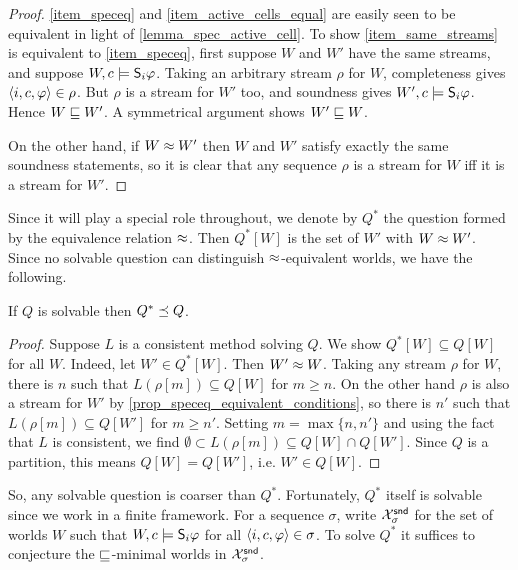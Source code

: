 \begin{proof}
    \cref{item_speceq} and \cref{item_active_cells_equal} are easily seen to be
    equivalent in light of \cref{lemma_spec_active_cell}. To show
    \cref{item_same_streams} is equivalent to \cref{item_speceq}, first suppose
    $W$ and $W'$ have the same streams, and suppose $W, c \models \S_i\phi$.
    Taking an arbitrary stream $\rho$ for $W$, completeness gives $\tuple{i, c,
    \phi} \in \rho$. But $\rho$ is a stream for $W'$ too, and soundness gives
    $W', c \models \S_i\phi$. Hence $W \specleq W'$. A symmetrical argument
    shows $W' \specleq W$.

    On the other hand, if $W \speceq W'$ then $W$ and $W'$ satisfy exactly the
    same soundness statements, so it is clear that any sequence $\rho$ is a
    stream for $W$ iff it is a stream for $W'$.
\end{proof}

Since it will play a special role throughout, we denote by $Q^*$ the question
formed by the equivalence relation $\speceq$. Then $Q^*[W]$ is the set of $W'$
with $W \speceq W'$. Since no solvable question can distinguish
$\speceq$-equivalent worlds, we have the following.

\begin{lemma}
    \label{lemma_solvable_implies_coarser_than_qstar}
    If $Q$ is solvable then $Q^* \refines Q$.
\end{lemma}

\begin{proof}
    Suppose $L$ is a consistent method solving $Q$. We show $Q^*[W] \subseteq
    Q[W]$ for all $W$.  Indeed, let $W' \in Q^*[W]$. Then $W' \speceq W$.
    Taking any stream $\rho$ for $W$, there is $n$ such that $L(\rho[m])
    \subseteq Q[W]$ for $m \ge n$. On the other hand $\rho$ is also a stream
    for $W'$ by \cref{prop_speceq_equivalent_conditions}, so there is $n'$ such
    that $L(\rho[m]) \subseteq Q[W']$ for $m \ge n'$. Setting $m = \max\{n,
    n'\}$ and using the fact that $L$ is consistent, we find $\emptyset \subset
    L(\rho[m]) \subseteq Q[W] \cap Q[W']$. Since $Q$ is a partition, this means
    $Q[W] = Q[W']$, i.e. $W' \in Q[W]$.
\end{proof}

So, any solvable question is coarser than $Q^*$. Fortunately, $Q^*$ itself is
solvable since we work in a finite framework. For a sequence $\sigma$, write
$\Xsnd_\sigma$ for the set of worlds $W$ such that $W, c \models \S_i\phi$ for
all $\tuple{i, c, \phi} \in \sigma$. To solve $Q^*$ it suffices to conjecture
the $\specleq$-minimal worlds in $\Xsnd_\sigma$.

